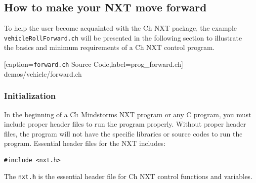 \documentclass[11pt]{article}
\begin{document}
\subsection{How to make your NXT move forward}
To help the user become acquainted with the Ch NXT package, the example 
{\tt vehicleRollForward.ch} will be presented in the following section to illustrate 
the basics and minimum requirements of a Ch NXT control program. 

[caption={{\tt forward.ch} Source Code},label=prog_forward.ch]
{demos/vehicle/forward.ch}

\subsubsection{Initialization}
In the beginning of a Ch Mindstorms NXT program or any C program, you must include 
proper header files to run the program properly. Without proper header files, the 
program will not have the specific libraries or source codes to run the program. 
Essential header files for the NXT includes:
\begin{lstlisting}
#include <nxt.h>
\end{lstlisting}
The {\tt nxt.h} is the essential header file for Ch NXT control functions and 
variables.  
\end{document}
